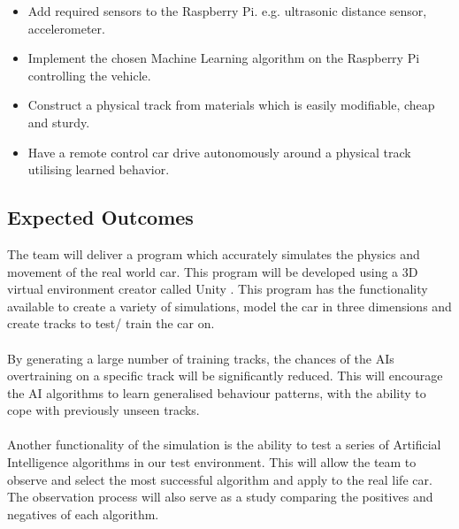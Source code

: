 \documentclass[8pt]{article}
\begin{document}
\begin{itemize}
	\item Add required sensors to the Raspberry Pi. e.g. ultrasonic distance sensor, accelerometer.

	\item Implement the chosen Machine Learning algorithm on the Raspberry Pi controlling the vehicle.
	
	\item Construct a physical track from materials which is easily modifiable, cheap and sturdy.  
	
	\item Have a remote control car drive autonomously around a physical track utilising learned behavior.
\end{itemize}

\subsection{Expected Outcomes}
The team will deliver a program which accurately simulates the physics and movement of the real world car. This program will be developed using a 3D virtual environment creator called Unity \cite{Unity3D}. This program has the functionality available to create a variety of simulations, model the car in three dimensions and create tracks to test/ train the car on. 
\\\\
By generating a large number of training tracks, the chances of the AIs overtraining on a specific track will be significantly reduced. This will encourage the AI algorithms to learn generalised behaviour patterns, with the ability to cope with previously unseen tracks.
\\\\
Another functionality of the simulation is the ability to test a series of Artificial Intelligence algorithms in our test environment. This will allow the team to observe and select the most successful algorithm and apply to the real life car. The observation process will also serve as a study comparing the positives and negatives of each algorithm. 
\newpage
\end{document}
